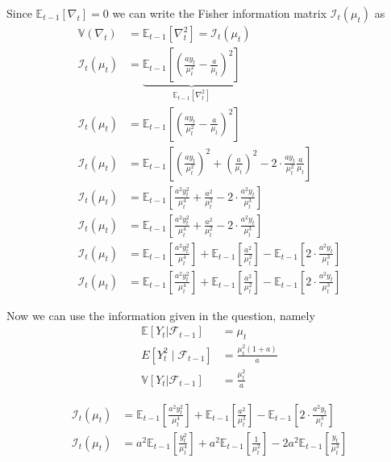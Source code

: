 \documentclass{article}
\begin{document}
Since $\mathbb{E}_{t-1}\left[\nabla_{t}\right]=0$ we can write the
Fisher information matrix $\mathcal{I}_{t}\left(\mu_{t}\right)$ as
\begin{align*}
\mathbb{V}\left(\nabla_{t}\right) & =\mathbb{E}_{t-1}\left[\nabla_{t}^{2}\right]=\mathcal{I}_{t}\left(\mu_{t}\right)\\
\mathcal{I}_{t}\left(\mu_{t}\right) & =\underbrace{\mathbb{E}_{t-1}\left[\left(\frac{ay_{t}}{\mu_{t}^{2}}-\frac{a}{\mu_{t}}\right)^{2}\right]}_{\mathbb{E}_{t-1}\left[\nabla_{t}^{2}\right]}\\
\mathcal{I}_{t}\left(\mu_{t}\right) & =\mathbb{E}_{t-1}\left[\left(\frac{ay_{t}}{\mu_{t}^{2}}-\frac{a}{\mu_{t}}\right)^{2}\right]\\
\mathcal{I}_{t}\left(\mu_{t}\right) & =\mathbb{E}_{t-1}\left[\left(\frac{ay_{t}}{\mu_{t}^{2}}\right)^{2}+\left(\frac{a}{\mu_{t}}\right)^{2}-2\cdot\frac{ay_{t}}{\mu_{t}^{2}}\frac{a}{\mu_{t}}\right]\\
\mathcal{I}_{t}\left(\mu_{t}\right) & =\mathbb{E}_{t-1}\left[\frac{a^{2}y_{t}^{2}}{\mu_{t}^{4}}+\frac{a^{2}}{\mu_{t}^{2}}-2\cdot\frac{a^{2}y_{t}}{\mu_{t}^{3}}\right]\\
\mathcal{I}_{t}\left(\mu_{t}\right) & =\mathbb{E}_{t-1}\left[\frac{a^{2}y_{t}^{2}}{\mu_{t}^{4}}+\frac{a^{2}}{\mu_{t}^{2}}-2\cdot\frac{a^{2}y_{t}}{\mu_{t}^{3}}\right]\\
\mathcal{I}_{t}\left(\mu_{t}\right) & =\mathbb{E}_{t-1}\left[\frac{a^{2}y_{t}^{2}}{\mu_{t}^{4}}\right]+\mathbb{E}_{t-1}\left[\frac{a^{2}}{\mu_{t}^{2}}\right]-\mathbb{E}_{t-1}\left[2\cdot\frac{a^{2}y_{t}}{\mu_{t}^{3}}\right]\\
\mathcal{I}_{t}\left(\mu_{t}\right) & =\mathbb{E}_{t-1}\left[\frac{a^{2}y_{t}^{2}}{\mu_{t}^{4}}\right]+\mathbb{E}_{t-1}\left[\frac{a^{2}}{\mu_{t}^{2}}\right]-\mathbb{E}_{t-1}\left[2\cdot\frac{a^{2}y_{t}}{\mu_{t}^{3}}\right]
\end{align*}

Now we can use the information given in the question, namely 
\begin{align*}
\mathbb{E}\left[Y_{t}\rvert\mathcal{F}_{t-1}\right] & =\mu_{t}\\
E\left[Y_{t}^{2}\mid\mathcal{F}_{t-1}\right] & =\frac{\mu_{t}^{2}(1+a)}{a}\\
\mathbb{V}\left[Y_{t}\rvert\mathcal{F}_{t-1}\right] & =\frac{\mu_{t}^{2}}{a}
\end{align*}

\begin{align*}
\mathcal{I}_{t}\left(\mu_{t}\right) & =\mathbb{E}_{t-1}\left[\frac{a^{2}y_{t}^{2}}{\mu_{t}^{4}}\right]+\mathbb{E}_{t-1}\left[\frac{a^{2}}{\mu_{t}^{2}}\right]-\mathbb{E}_{t-1}\left[2\cdot\frac{a^{2}y_{t}}{\mu_{t}^{3}}\right]\\
\mathcal{I}_{t}\left(\mu_{t}\right) & =a^{2}\mathbb{E}_{t-1}\left[\frac{y_{t}^{2}}{\mu_{t}^{4}}\right]+a^{2}\mathbb{E}_{t-1}\left[\frac{1}{\mu_{t}^{2}}\right]-2a^{2}\mathbb{E}_{t-1}\left[\frac{y_{t}}{\mu_{t}^{3}}\right]
\end{align*}
\end{document}
